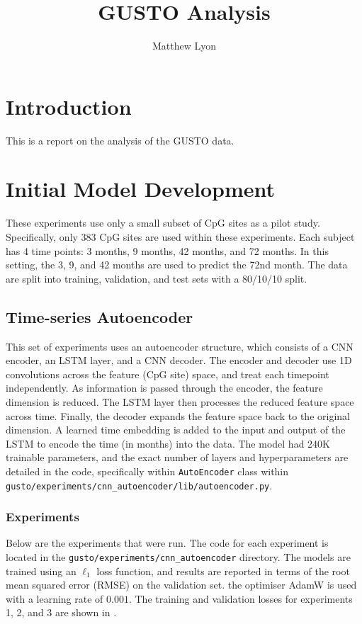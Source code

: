 \documentclass[twocolumn, 9pt]{extarticle}
\begin{document}
\title{GUSTO Analysis}

\author{Matthew Lyon}

\setcounter{Maxaffil}{0}
\renewcommand\Affilfont{\itshape\small}

\date{}
\maketitle

\section{Introduction}

This is a report on the analysis of the GUSTO data.

\section{Initial Model Development}

These experiments use only a small subset of CpG sites as a pilot study. Specifically, only 383 CpG sites are used within these experiments. Each subject has 4 time points: 3 months, 9 months, 42 months, and 72 months. In this setting, the 3, 9, and 42 months are used to predict the 72nd month. The data are split into training, validation, and test sets with a 80/10/10 split.

\subsection{Time-series Autoencoder}

This set of experiments uses an autoencoder structure, which consists of a CNN encoder, an LSTM layer, and a CNN decoder. The encoder and decoder use 1D convolutions across the feature (CpG site) space, and treat each timepoint independently. As information is passed through the encoder, the feature dimension is reduced. The LSTM layer then processes the reduced feature space across time. Finally, the decoder expands the feature space back to the original dimension. A learned time embedding is added to the input and output of the LSTM to encode the time (in months) into the data. The model had 240K trainable parameters, and the exact number of layers and hyperparameters are detailed in the code, specifically within \texttt{AutoEncoder} class within \texttt{gusto/experiments/cnn\_autoencoder/lib/autoencoder.py}.

\subsubsection{Experiments}
Below are the experiments that were run. The code for each experiment is located in the \texttt{gusto/experiments/cnn\_autoencoder} directory. The models are trained using an $\ell_{1}$ loss function, and results are reported in terms of the root mean squared error (RMSE) on the validation set. the optimiser AdamW is used with a learning rate of $0.001$. The training and validation losses for experiments 1, 2, and 3 are shown in .
\end{document}
